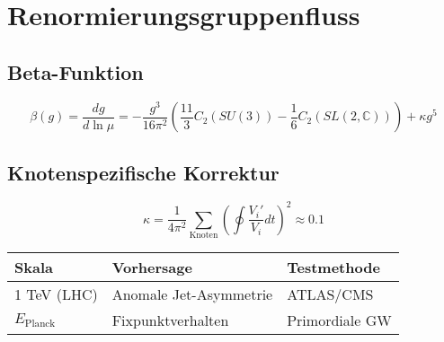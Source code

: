 \section{Renormierungsgruppenfluss}

\subsection{Beta-Funktion}
\[
\beta(g) = \frac{dg}{d\ln\mu} = -\frac{g^3}{16\pi^2} \left( \frac{11}{3} C_2(SU(3)) - \frac{1}{6} C_2(SL(2,\mathbb{C})) \right) + \kappa g^5
\]

\subsection{Knotenspezifische Korrektur}
\[
\kappa = \frac{1}{4\pi^2} \sum_{\text{Knoten}} \left( \oint \frac{V_i'}{V_i} dt \right)^2 \approx 0.1
\]

\begin{table}[h]
\centering
\begin{tabular}{|l|l|l|}
\hline
\textbf{Skala} & \textbf{Vorhersage} & \textbf{Testmethode} \\ \hline
1 TeV (LHC) & Anomale Jet-Asymmetrie & ATLAS/CMS \\ \hline
$E_{\text{Planck}}$ & Fixpunktverhalten & Primordiale GW \\ \hline
\end{tabular}
\end{table}